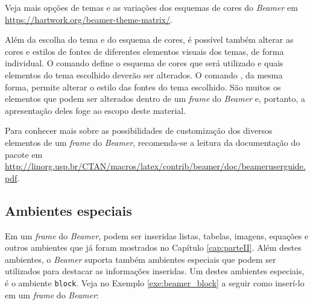 \begin{marker}
Veja mais opções de temas e as variações dos esquemas de cores do \textit{Beamer} em \url{https://hartwork.org/beamer-theme-matrix/}.
\end{marker}

Além da escolha do tema e do esquema de cores, é possível também alterar as cores e estilos de fontes de diferentes elementos visuais dos temas, de forma individual. O comando  define o esquema de cores que será utilizado e quais elementos do tema escolhido deverão ser alterados. O comando , da mesma forma, permite alterar o estilo das fontes do tema escolhido. São muitos os elementos que podem ser alterados dentro de um \textit{frame} do \textit{Beamer} e, portanto, a apresentação deles foge ao escopo deste material.

\begin{marker}
Para conhecer mais sobre as possibilidades de customização dos diversos elementos de um \textit{frame} do \textit{Beamer}, recomenda-se a leitura da documentação do pacote em \url{http://linorg.usp.br/CTAN/macros/latex/contrib/beamer/doc/beameruserguide.pdf}.
\end{marker}

\subsection{Ambientes especiais}
\label{sec:estrut_slide}

Em um \textit{frame} do \textit{Beamer}, podem ser inseridas listas, tabelas, imagens, equações e outros ambientes que já foram mostrados no Capítulo \ref{cap:parteII}. Além destes ambientes, o \textit{Beamer} suporta também ambientes especiais que podem ser utilizados para destacar as informações inseridas. Um destes ambientes especiais, é o ambiente \texttt{block}. Veja no Exemplo \ref{exe:beamer_block} a seguir como inserí-lo em um \textit{frame} do \textit{Beamer}:

